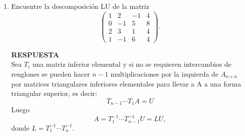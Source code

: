 \documentclass[11pt,letterpaper]{article}
\newcommand{\res}{\textbf{RESPUESTA}\\}
\begin{document}
\begin{enumerate}
\item Encuentre la descomposición LU de la matriz
\begin{equation*}
\left(\begin{array}{rrrr}
 1 &  2 & -1 & 4\\
 0 & -1 &  5 & 8\\
 2 &  3 &  1 & 4\\
 1 & -1 &  6 & 4
\end{array} \right).
\end{equation*}

\res Sea $T_i$  una matriz inferior elemental y si no se requieren intercambios de renglones se pueden hacer $n-1$
multiplicaciones por la izquierda de $A_{n\times n}$ por matrices triangulares inferiores elementales para llevar a A a una forma triangular superior, es decir:
$$T_{n-1} \cdots T_1 A=U$$ 
Luego 
$$A=T^{-1}_1\cdots T^{-1}_{n-1}U=LU,$$
donde $L=T^{-1}_1\cdots T^{-1}_n$.\\


\end{enumerate}
\end{document}
